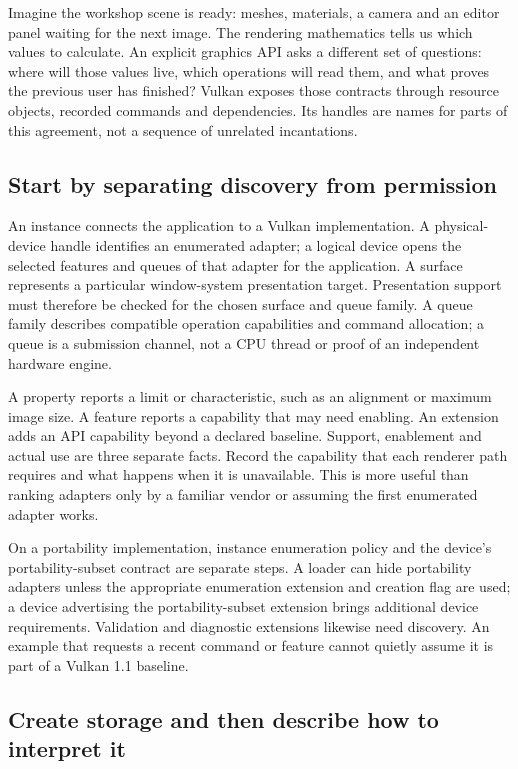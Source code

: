 Imagine the workshop scene is ready: meshes, materials, a camera and an editor panel waiting for the next image. The rendering mathematics tells us which values to calculate. An explicit graphics API asks a different set of questions: where will those values live, which operations will read them, and what proves the previous user has finished? Vulkan exposes those contracts through resource objects, recorded commands and dependencies. Its handles are names for parts of this agreement, not a sequence of unrelated incantations.

\subsection{Start by separating discovery from permission}\label{05-engine-i-ch019-start-by-separating-discovery-from-permission}

An instance connects the application to a Vulkan implementation. A physical-device handle identifies an enumerated adapter; a logical device opens the selected features and queues of that adapter for the application. A surface represents a particular window-system presentation target. Presentation support must therefore be checked for the chosen surface and queue family. A queue family describes compatible operation capabilities and command allocation; a queue is a submission channel, not a CPU thread or proof of an independent hardware engine.

A property reports a limit or characteristic, such as an alignment or maximum image size. A feature reports a capability that may need enabling. An extension adds an API capability beyond a declared baseline. Support, enablement and actual use are three separate facts. Record the capability that each renderer path requires and what happens when it is unavailable. This is more useful than ranking adapters only by a familiar vendor or assuming the first enumerated adapter works.

On a portability implementation, instance enumeration policy and the device's portability-subset contract are separate steps. A loader can hide portability adapters unless the appropriate enumeration extension and creation flag are used; a device advertising the portability-subset extension brings additional device requirements. Validation and diagnostic extensions likewise need discovery. An example that requests a recent command or feature cannot quietly assume it is part of a Vulkan 1.1 baseline.

\subsection{Create storage and then describe how to interpret it}\label{05-engine-i-ch019-create-storage-and-then-describe-how-to-interpret-it}

